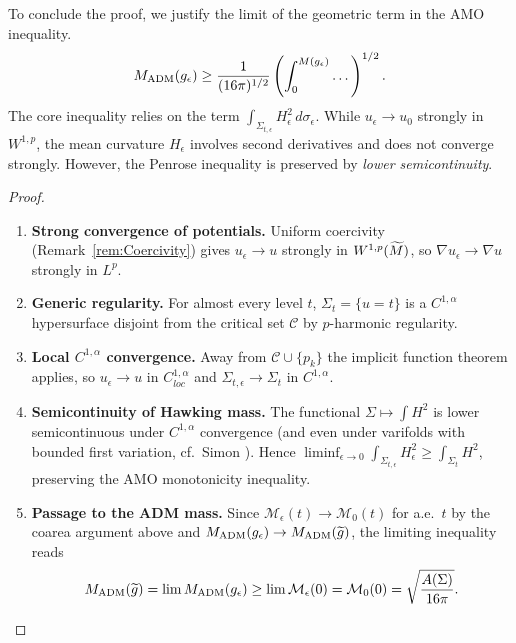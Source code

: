 \begin{theorem}\label{thm:CurvatureLSC}
To conclude the proof, we justify the limit of the geometric term in the AMO inequality.
\[ M_{\mathrm{ADM}}(g_{\epsilon}) \ge \frac{1}{(16\pi)^{1/2}} \left( \int_0^{M(g_{\epsilon})} \dots \right)^{1/2}. \]
The core inequality relies on the term $\int_{\Sigma_{t,\epsilon}} H_\epsilon^2 \, d\sigma_\epsilon$. While $u_\epsilon \to u_0$ strongly in $W^{1,p}$, the mean curvature $H_\epsilon$ involves second derivatives and does not converge strongly. However, the Penrose inequality is preserved by \emph{lower semicontinuity}.
\begin{proof}
\begin{enumerate}
    \item \textbf{Strong convergence of potentials.} Uniform coercivity (Remark~\ref{rem:Coercivity}) gives $u_\epsilon \to u$ strongly in $W^{1,p}(\widetilde{M})$, so $\nabla u_\epsilon \to \nabla u$ strongly in $L^p$.
    \item \textbf{Generic regularity.} For almost every level $t$, $\Sigma_t = \{u=t\}$ is a $C^{1,\alpha}$ hypersurface disjoint from the critical set $\mathcal{C}$ by $p$-harmonic regularity.
    \item \textbf{Local $C^{1,\alpha}$ convergence.} Away from $\mathcal{C}\cup \{p_k\}$ the implicit function theorem applies, so $u_\epsilon \to u$ in $C^{1,\alpha}_{loc}$ and $\Sigma_{t,\epsilon} \to \Sigma_t$ in $C^{1,\alpha}$.
    \item \textbf{Semicontinuity of Hawking mass.} The functional $\Sigma \mapsto \int H^2$ is lower semicontinuous under $C^{1,\alpha}$ convergence (and even under varifolds with bounded first variation, cf.~Simon \cite{simon1983}). Hence $\liminf_{\epsilon\to 0} \int_{\Sigma_{t,\epsilon}} H_\epsilon^2 \ge \int_{\Sigma_t} H^2$, preserving the AMO monotonicity inequality.
    \item \textbf{Passage to the ADM mass.} Since $\mathcal{M}_\epsilon(t) \to \mathcal{M}_0(t)$ for a.e.~$t$ by the coarea argument above and $M_{\mathrm{ADM}}(g_{\epsilon}) \to M_{\mathrm{ADM}}(\widetilde{g})$, the limiting inequality reads
    \[ M_{\mathrm{ADM}}(\widetilde{g}) = \lim M_{\mathrm{ADM}}(g_{\epsilon}) \ge \lim \mathcal{M}_\epsilon(0) = \mathcal{M}_0(0) = \sqrt{\frac{A(\Sigma)}{16\pi}}. \]
\end{enumerate}
\end{proof}
\end{theorem}


